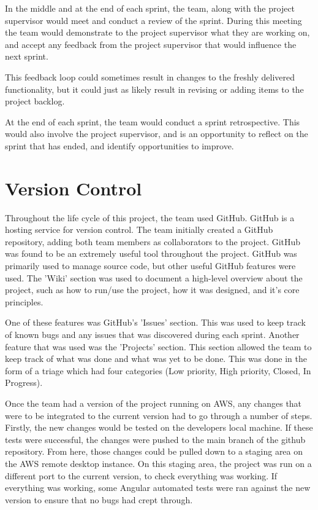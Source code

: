 \bigskip
In the middle and at the end of each sprint, the team, along with the project supervisor would meet and conduct a review of the sprint. During this meeting the team would demonstrate to the project supervisor what they are working on, and accept any feedback from the project supervisor that would influence the next sprint.

This feedback loop could sometimes result in changes to the freshly delivered functionality, but it could just as likely result in revising or adding items to the project backlog.

\bigskip
At the end of each sprint, the team would conduct a sprint retrospective\cite{moe2010teamwork}. This would also involve the project supervisor, and is an opportunity to reflect on the sprint that has ended, and identify opportunities to improve.
\section{Version Control}
\label{sec:MethodologyVersionControl}
Throughout the life cycle of this project, the team used GitHub. GitHub is a hosting service for version control. The team initially created a GitHub repository, adding both team members as collaborators to the project. GitHub was found to be an extremely useful tool throughout the project. GitHub was primarily used to manage source code, but other useful GitHub features were used. The 'Wiki' section was used to document a high-level overview about the project, such as how to run/use the project, how it was designed, and it's core principles.

\bigskip
One of these features was GitHub's 'Issues' section. This was used to keep track of known bugs and any issues that was discovered during each sprint. Another feature that was used was the 'Projects' section. This section allowed the team to keep track of what was done and what was yet to be done. This was done in the form of a triage which had four categories (Low priority, High priority, Closed, In Progress).

Once the team had a version of the project running on AWS, any changes that were to be integrated to the current version had to go through a number of steps. Firstly, the new changes would be tested on the developers local machine. If these tests were successful, the changes were pushed to the main branch of the github repository. From here, those changes could be pulled down to a staging area on the AWS remote desktop instance. On this staging area, the project was run on a different port to the current version, to check everything was working. If everything was working, some Angular automated tests were ran against the new version to ensure that no bugs had crept through.

